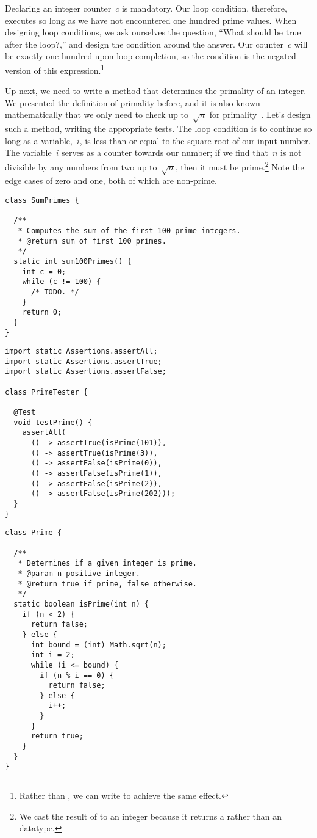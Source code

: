 Declaring an integer counter~$c$ is mandatory. 
Our loop condition, therefore, executes so long as we have not encountered one hundred prime values. 
When designing loop conditions, we ask ourselves the question, ``What should be true after the loop?,'' and design the condition around the answer. 
Our counter~$c$ will be exactly one hundred upon loop completion, so the condition is the negated version of this expression.\footnote{Rather than , we can write  to achieve the same effect.}

Up next, we need to write a method that determines the primality of an integer. 
We presented the definition of primality before, and it is also known mathematically that we only need to check up to~$\sqrt{n}$ for primality~\citep{riesel}. 
Let's design such a method, writing the appropriate tests. 
The loop condition is to continue so long as a variable,~$i$, is less than or equal to the square root of our input number. 
The variable~$i$ serves as a counter towards our number; if we find that~$n$ is not divisible by any numbers from two up to~$\sqrt{n}$, then it must be prime.\footnote{We cast the result of  to an integer because it returns a  rather than an  datatype.} 
Note the edge cases of zero and one, both of which are non-prime.

\begin{lstlisting}[language=MyJava]
class SumPrimes {

  /**
   * Computes the sum of the first 100 prime integers.
   * @return sum of first 100 primes.
   */
  static int sum100Primes() {
    int c = 0;
    while (c != 100) { 
      /* TODO. */ 
    }
    return 0;
  }
}
\end{lstlisting}

\enlargethispage{-3\baselineskip}
\begin{lstlisting}[language=MyJava]
import static Assertions.assertAll;
import static Assertions.assertTrue;
import static Assertions.assertFalse;

class PrimeTester {

  @Test
  void testPrime() {
    assertAll(
      () -> assertTrue(isPrime(101)),
      () -> assertTrue(isPrime(3)),
      () -> assertFalse(isPrime(0)),
      () -> assertFalse(isPrime(1)),
      () -> assertFalse(isPrime(2)),
      () -> assertFalse(isPrime(202)));
  }
}
\end{lstlisting}

\enlargethispage{-2\baselineskip}
\begin{lstlisting}[language=MyJava]
class Prime {

  /**
   * Determines if a given integer is prime.
   * @param n positive integer.
   * @return true if prime, false otherwise.
   */
  static boolean isPrime(int n) {
    if (n < 2) { 
      return false;
    } else {
      int bound = (int) Math.sqrt(n);
      int i = 2;
      while (i <= bound) {
        if (n % i == 0) { 
          return false; 
        } else { 
          i++; 
        }
      }
      return true;
    }
  }
}
\end{lstlisting}

